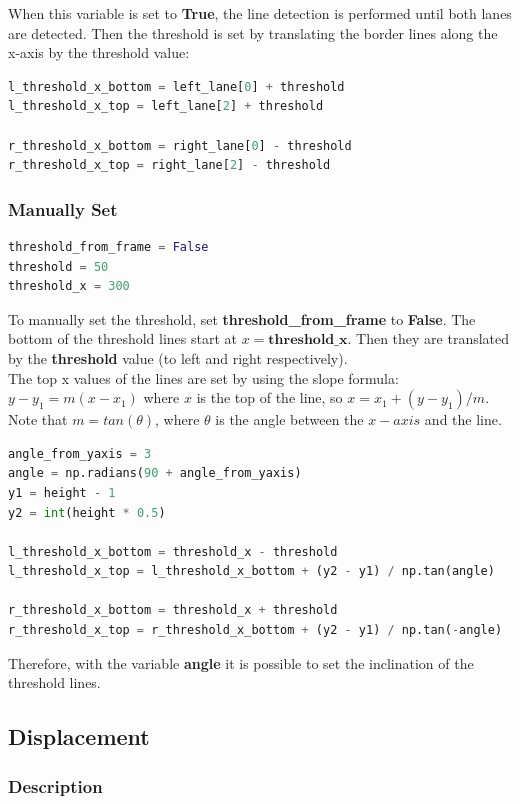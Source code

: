 \documentclass[12pt]{article}
\begin{document}
When this variable is set to \textbf{True}, the line detection is performed until both lanes are detected. Then the threshold is set by translating the border lines along the x-axis by the threshold value:
\begin{lstlisting}[language=Python]
l_threshold_x_bottom = left_lane[0] + threshold
l_threshold_x_top = left_lane[2] + threshold

r_threshold_x_bottom = right_lane[0] - threshold
r_threshold_x_top = right_lane[2] - threshold
\end{lstlisting}

\subsubsection*{Manually Set}

\begin{lstlisting}[language=Python]
threshold_from_frame = False
threshold = 50 
threshold_x = 300
\end{lstlisting}

To manually set the threshold, set \textbf{threshold\_from\_frame} to \textbf{False}. The bottom of the threshold lines start at $x=\textbf{threshold\_x}$. Then they are translated by the \textbf{threshold} value (to left and right respectively). 
\\The top x values of the lines are set by using the slope formula: $y-y_1=m(x-x_1)$ where $x$ is the top of the line, so $x=x_1+(y-y_1)/m$. Note that $m=tan(\theta)$, where $\theta$ is the angle between the $x-axis$ and the line.

\begin{lstlisting}[language=Python]
angle_from_yaxis = 3
angle = np.radians(90 + angle_from_yaxis)  
y1 = height - 1 
y2 = int(height * 0.5)

l_threshold_x_bottom = threshold_x - threshold
l_threshold_x_top = l_threshold_x_bottom + (y2 - y1) / np.tan(angle)

r_threshold_x_bottom = threshold_x + threshold
r_threshold_x_top = r_threshold_x_bottom + (y2 - y1) / np.tan(-angle)
\end{lstlisting}
Therefore, with the variable \textbf{angle} it is possible to set the inclination of the threshold lines.


\subsection{Displacement}
\subsubsection*{Description}
\end{document}

